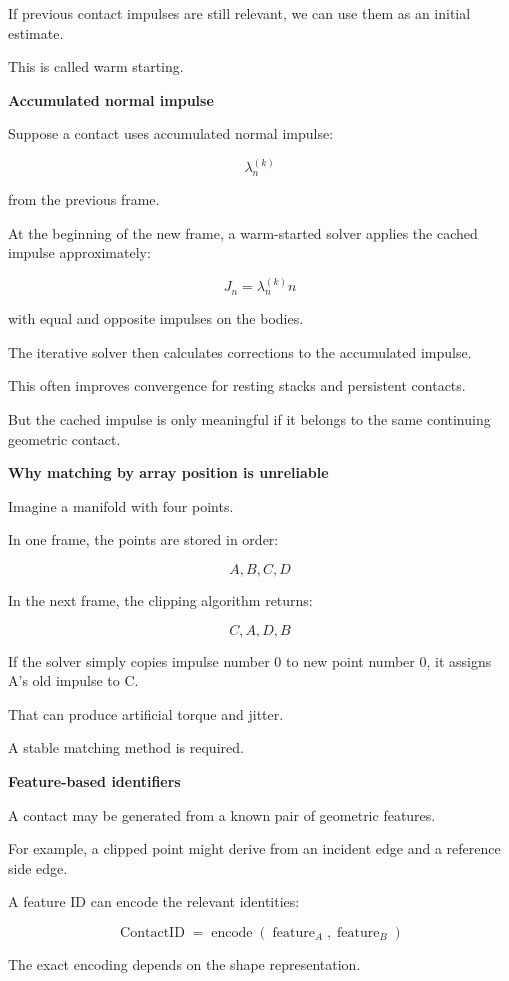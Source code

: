 If previous contact impulses are still relevant, we can use them as an initial estimate.

This is called warm starting.

\textbf{Accumulated normal impulse}

Suppose a contact uses accumulated normal impulse:

\[
\lambda_n^{(k)}
\]

from the previous frame.

At the beginning of the new frame, a warm-started solver applies the cached impulse approximately:

\[
\boxed{ J_n=\lambda_n^{(k)}n }
\]

with equal and opposite impulses on the bodies.

The iterative solver then calculates corrections to the accumulated impulse.

This often improves convergence for resting stacks and persistent contacts.

But the cached impulse is only meaningful if it belongs to the same continuing geometric contact.

\textbf{Why matching by array position is unreliable}

Imagine a manifold with four points.

In one frame, the points are stored in order:

\[
A,B,C,D
\]

In the next frame, the clipping algorithm returns:

\[
C,A,D,B
\]

If the solver simply copies impulse number 0 to new point number 0, it assigns A's old impulse to C.

That can produce artificial torque and jitter.

A stable matching method is required.

\textbf{Feature-based identifiers}

A contact may be generated from a known pair of geometric features.

For example, a clipped point might derive from an incident edge and a reference side edge.

A feature ID can encode the relevant identities:

\[
\boxed{ \operatorname{ContactID} = \operatorname{encode}(\operatorname{feature}_A,\operatorname{feature}_B) }
\]

The exact encoding depends on the shape representation.

